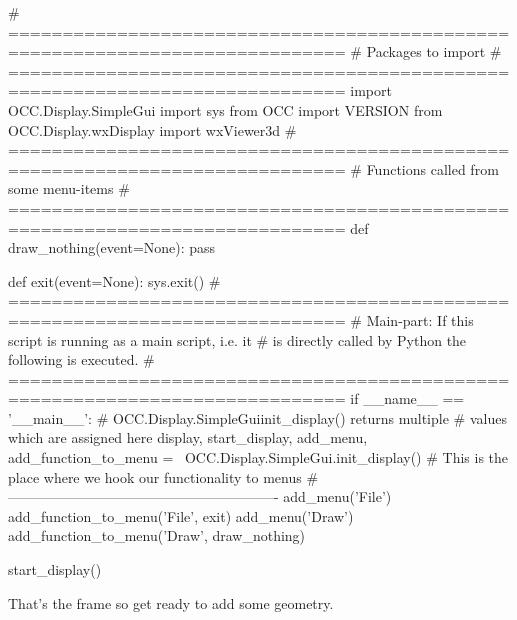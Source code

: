 \pagebreak
\begin{python}[moreemph={[4], 46, 48},caption={Step1.py - The program frame},label=LISTING_STEP1_PY]
# =============================================================================
# Packages to import
# =============================================================================
import OCC.Display.SimpleGui 
import sys
from OCC import VERSION
from OCC.Display.wxDisplay import wxViewer3d
# =============================================================================
# Functions called from some menu-items
# =============================================================================
def draw_nothing(event=None):
    pass

def exit(event=None):
    sys.exit()
# =============================================================================
# Main-part: If this script is running as a main script, i.e. it 
# is directly called by Python the following is executed.
# =============================================================================
if __name__ == '__main__':
    # OCC.Display.SimpleGuiinit_display() returns multiple
    # values which are assigned here
    display, start_display, add_menu, add_function_to_menu = \
        OCC.Display.SimpleGui.init_display()
    # This is the place where we hook our functionality to menus
    # ----------------------------------------------------------
    add_menu('File')
    add_function_to_menu('File',  exit)
    add_menu('Draw')
    add_function_to_menu('Draw', draw_nothing)
    
    start_display()
\end{python}

That's the frame so get ready to add some geometry.
